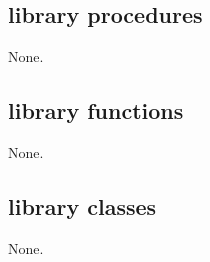     \subsection{library procedures}
    
        None.
        


    \subsection{library functions}
    
        None.


    \subsection{library classes}
    
        None.
